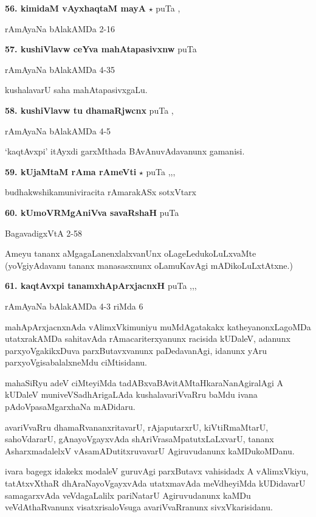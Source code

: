 \medskip
\noindent\textbf{56. kimidaM vAyxhaqtaM mayA} $\star$ \hfill puTa \pageref{20},\pageref{157}

\hfill rAmAyaNa bAlakAMDa 2-16

\medskip
\noindent\textbf{57. kushiVlavw ceYva mahAtapasivxnw} \hfill puTa \pageref{167a}

\hfill rAmAyaNa bAlakAMDa 4-35

kushalavarU saha mahAtapasivxgaLu.

\medskip
\noindent\textbf{58. kushiVlavw tu dhamaRjwcnx} \hfill puTa \pageref{238b},\pageref{240}

\hfill rAmAyaNa bAlakAMDa 4-5

`kaqtAvxpi' itAyxdi garxMthada BAvAnuvAdavanunx gamanisi.

\medskip
\noindent\textbf{59. kUjaMtaM rAma rAmeVti} $\star$ \hfill puTa \pageref{136},\pageref{148},\pageref{169},\pageref{184}

\hfill budhakwshikamuniviracita rAmarakASx sotxVtarx

\medskip
\noindent\textbf{60. kUmoVRMgAniVva savaRshaH} \hfill puTa \pageref{222}

\hfill BagavadigxVtA 2-58

Ameyu tananx aMgagaLanenxlalxvanUnx oLageLedukoLuLxvaMte (yoVgiyAdavanu tananx manasasxnunx oLamuKavAgi mADikoLuLxtAtxne.)

\medskip
\noindent\textbf{61. kaqtAvxpi tanamxhApArxjacnxH} \hfill puTa \pageref{165},\pageref{167},\pageref{209},\pageref{238a}

\hfill rAmAyaNa bAlakAMDa 4-3 riMda 6

mahApArxjacnxnAda vAlimxVkimuniyu muMdAgatakakx katheyanonxLagoMDa utatxrakAMDa sahitavAda rAmacariterxyanunx racisida kUDaleV, adanunx parxyoVgakikxDuva parxButavxvanunx paDedavanAgi, idanunx yAru parxyoVgisabalalxneMdu ciMtisidanu.

mahaSiRyu adeV ciMteyiMda tadABxvaBAvitAMtaHkaraNanAgiralAgi A kUDaleV muniveVSadhArigaLAda kushalavariVvaRru baMdu ivana pAdoVpasaMgarxhaNa mADidaru.

avariVvaRru dhamaRvananxritavarU, rAjaputarxrU, kiVtiRmaMtarU, sahoVdararU, gAnayoVgayxvAda shAriVrasaMpatutxLaLxvarU, tananx AsharxmadalelxV vAsamADutitxruvavarU Agiruvudanunx kaMDukoMDanu.

ivara bagegx idakekx modaleV guruvAgi parxButavx vahisidadx A vAlimxVkiyu, tatAtxvXthaR dhAraNayoVgayxvAda utatxmavAda meVdheyiMda kUDidavarU samagarxvAda veVdagaLalilx pariNatarU Agiruvudanunx kaMDu veVdAthaRvanunx visatxrisaloVsuga avariVvaRranunx sivxVkarisidanu.

